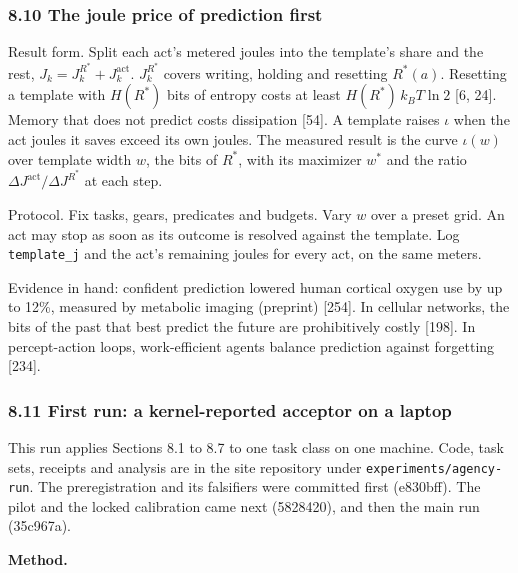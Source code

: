 \documentclass[
  10pt,
]{article}
\begin{document}
\subsubsection{8.10 The joule price of prediction
first}\label{the-joule-price-of-prediction-first}

Result form. Split each act's metered joules into the template's share
and the rest, \(J_k = J_k^{R^*} + J_k^{\mathrm{act}}\). \(J_k^{R^*}\)
covers writing, holding and resetting \(R^*(a)\). Resetting a template
with \(H(R^*)\) bits of entropy costs at least \(H(R^*)\,k_B T\ln 2\)
{[}6, 24{]}. Memory that does not predict costs dissipation {[}54{]}. A
template raises \(\iota\) when the act joules it saves exceed its own
joules. The measured result is the curve \(\iota(w)\) over template
width \(w\), the bits of \(R^*\), with its maximizer \(w^*\) and the
ratio \(\Delta J^{\mathrm{act}}/\Delta J^{R^*}\) at each step.

Protocol. Fix tasks, gears, predicates and budgets. Vary \(w\) over a
preset grid. An act may stop as soon as its outcome is resolved against
the template. Log \texttt{template\_j} and the act's remaining joules
for every act, on the same meters.

Evidence in hand: confident prediction lowered human cortical oxygen use
by up to 12\%, measured by metabolic imaging (preprint) {[}254{]}. In
cellular networks, the bits of the past that best predict the future are
prohibitively costly {[}198{]}. In percept-action loops, work-efficient
agents balance prediction against forgetting {[}234{]}.

\subsubsection{8.11 First run: a kernel-reported acceptor on a
laptop}\label{first-run-a-kernel-reported-acceptor-on-a-laptop}

This run applies Sections 8.1 to 8.7 to one task class on one machine.
Code, task sets, receipts and analysis are in the site repository under
\texttt{experiments/agency-run}. The preregistration and its falsifiers
were committed first (e830bff). The pilot and the locked calibration
came next (5828420), and then the main run (35c967a).

\textbf{Method.}
\end{document}
